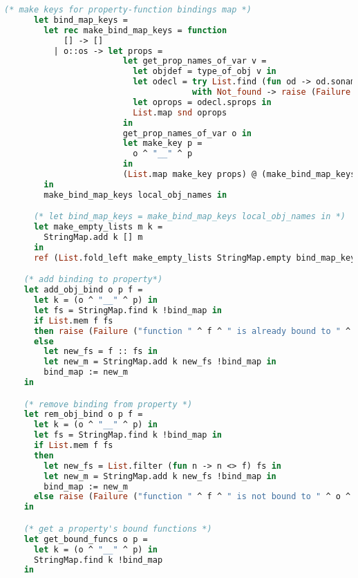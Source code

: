 \begin{lstlisting}[language=Caml,backgroundcolor=\color{backgroundcolor}]
      (* make keys for property-function bindings map *)
      let bind_map_keys =
        let rec make_bind_map_keys = function
            [] -> []
          | o::os -> let props =
                        let get_prop_names_of_var v =
                          let objdef = type_of_obj v in
                          let odecl = try List.find (fun od -> od.soname = objdef) objects
                                      with Not_found -> raise (Failure "can't find object") in
                          let oprops = odecl.sprops in
                          List.map snd oprops
                        in
                        get_prop_names_of_var o in
                        let make_key p =
                          o ^ "__" ^ p
                        in
                        (List.map make_key props) @ (make_bind_map_keys os)
        in
        make_bind_map_keys local_obj_names in

      (* let bind_map_keys = make_bind_map_keys local_obj_names in *)
      let make_empty_lists m k =
        StringMap.add k [] m
      in
      ref (List.fold_left make_empty_lists StringMap.empty bind_map_keys) in

    (* add binding to property*)
    let add_obj_bind o p f =
      let k = (o ^ "__" ^ p) in
      let fs = StringMap.find k !bind_map in
      if List.mem f fs
      then raise (Failure ("function " ^ f ^ " is already bound to " ^ o ^ "." ^ p))
      else
        let new_fs = f :: fs in
        let new_m = StringMap.add k new_fs !bind_map in
        bind_map := new_m
    in

    (* remove binding from property *)
    let rem_obj_bind o p f =
      let k = (o ^ "__" ^ p) in
      let fs = StringMap.find k !bind_map in
      if List.mem f fs
      then
        let new_fs = List.filter (fun n -> n <> f) fs in
        let new_m = StringMap.add k new_fs !bind_map in
        bind_map := new_m
      else raise (Failure ("function " ^ f ^ " is not bound to " ^ o ^ "." ^ p))
    in

    (* get a property's bound functions *)
    let get_bound_funcs o p =
      let k = (o ^ "__" ^ p) in
      StringMap.find k !bind_map
    in


\end{lstlisting}
